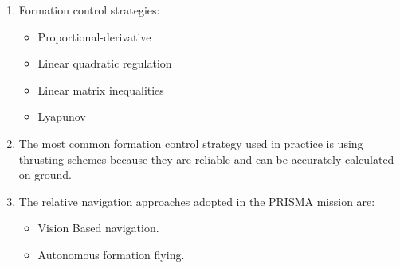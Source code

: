 \documentclass[a4paper]{article}
\begin{document}
\begin{enumerate}[label=\emph{\alph*)},series=preguntas1_1]
  \item %
    Formation control strategies:
  \begin{itemize}
    \item Proportional-derivative
    \item Linear quadratic regulation
    \item Linear matrix inequalities
    \item Lyapunov
  \end{itemize}

  \item %
    The most common formation control strategy used in practice is using thrusting schemes because they are reliable and can be accurately calculated on ground. 

  \item %
    The relative navigation approaches adopted in the PRISMA mission are:
    \begin{itemize}
      \item Vision Based navigation.
      \item Autonomous formation flying. 
   \end{itemize}

\end{enumerate}
\end{document}
